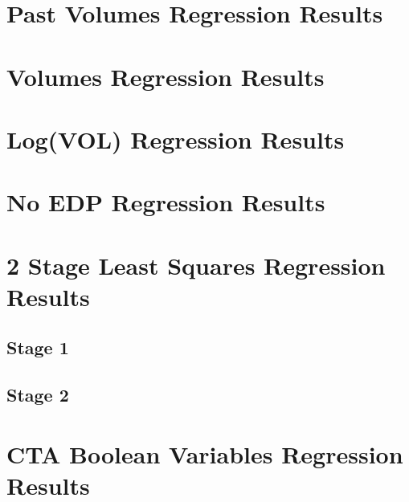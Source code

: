 \documentclass{article}
\begin{document}
\pagebreak

{}


\pagebreak

\begin{appendices}

\section{Past Volumes Regression Results}


\pagebreak

\section{Volumes Regression Results}


\pagebreak

\section{Log(VOL) Regression Results}


\pagebreak

\section{No EDP Regression Results}


\pagebreak

\section{2 Stage Least Squares Regression Results}

\subsection{Stage 1}


\pagebreak

\subsection{Stage 2}


\pagebreak

\section{CTA Boolean Variables Regression Results}



\end{appendices}
\end{document}
